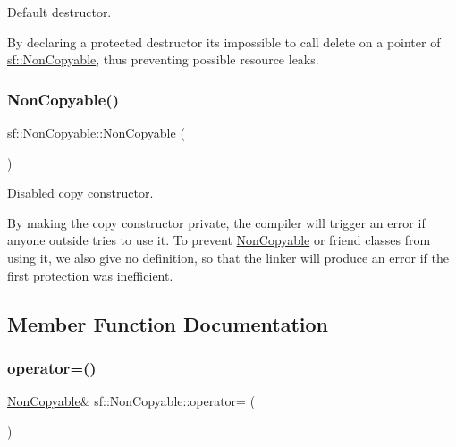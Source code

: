 Default destructor. 

By declaring a protected destructor it\textquotesingle{}s impossible to call delete on a pointer of \mbox{\hyperlink{classsf_1_1_non_copyable}{sf\+::\+Non\+Copyable}}, thus preventing possible resource leaks. \begin{DoxyVerb}\end{DoxyVerb}
 \mbox{\label{classsf_1_1_non_copyable_a57729c3045ce03f392ae1ba732224ddb}} 
\subsubsection{\texorpdfstring{NonCopyable()}{NonCopyable()}\hspace{0.1cm}{\footnotesize\ttfamily [2/2]}}
{\footnotesize\ttfamily sf\+::\+Non\+Copyable\+::\+Non\+Copyable (\begin{DoxyParamCaption}\item[{const \mbox{\hyperlink{classsf_1_1_non_copyable}{Non\+Copyable}} \&}]{ }\end{DoxyParamCaption})\hspace{0.3cm}{\ttfamily [private]}}



Disabled copy constructor. 

By making the copy constructor private, the compiler will trigger an error if anyone outside tries to use it. To prevent \mbox{\hyperlink{classsf_1_1_non_copyable}{Non\+Copyable}} or friend classes from using it, we also give no definition, so that the linker will produce an error if the first protection was inefficient. \begin{DoxyVerb}\end{DoxyVerb}
 

\subsection{Member Function Documentation}
\mbox{\label{classsf_1_1_non_copyable_ab5f6914b91378d9afc74e07094fc91e4}} 
\subsubsection{\texorpdfstring{operator=()}{operator=()}}
{\footnotesize\ttfamily \mbox{\hyperlink{classsf_1_1_non_copyable}{Non\+Copyable}}\& sf\+::\+Non\+Copyable\+::operator= (\begin{DoxyParamCaption}\item[{const \mbox{\hyperlink{classsf_1_1_non_copyable}{Non\+Copyable}} \&}]{ }\end{DoxyParamCaption})\hspace{0.3cm}{\ttfamily [private]}}



